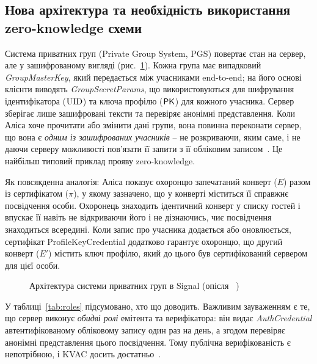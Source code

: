 \subsection{Нова архітектура та необхідність використання zero-knowledge схеми}
Система приватних груп (Private Group System, PGS) повертає стан на сервер, але у зашифрованому вигляді (рис.~\ref{fig:architecture}). 
Кожна група має випадковий \emph{GroupMasterKey}, який передається між учасниками end-to-end; на його основі 
клієнти виводять \emph{GroupSecretParams}, що використовуються для шифрування ідентифікатора ($\mathrm{UID}$) та ключа 
профілю ($\mathsf{PK}$) для кожного учасника. Сервер зберігає лише зашифровані тексти та перевіряє анонімні представлення. 
Коли Аліса хоче прочитати або змінити дані групи, вона повинна переконати сервер, що вона є \emph{одним із зашифрованих учасників} 
-- не розкриваючи, яким саме, і не даючи серверу можливості пов'язати її запити з її обліковим записом~\cite{CPZ20}. 
Це найбільш типовий приклад прояву zero-knowledge.

Як повсякденна аналогія: Аліса показує охоронцю запечатаний конверт ($E$) разом із сертифікатом ($\pi$), у якому 
зазначено, що у конверті міститься її справжнє посвідчення особи. Охоронець знаходить ідентичний конверт у списку 
гостей і впускає її навіть не відкриваючи його і не дізнаючись, чиє посвідчення знаходиться всередині. Коли запис 
про учасника додається або оновлюється, сертифікат ProfileKeyCredential додатково гарантує охоронцю, що 
другий конверт ($E'$) містить ключ профілю, який до цього був сертифікований сервером для цієї особи.

\begin{figure}[!ht]
  \centering
  \begin{minipage}{0.95\linewidth}
    \centering
    
    \caption{Архітектура системи приватних груп в Signal (опісля ~\cite{CPZ20})}
    \label{fig:architecture}
  \end{minipage}
\end{figure}

У таблиці~\ref{tab:roles} підсумовано, хто що доводить. Важливим зауваженням є те, що сервер виконує \emph{обидві ролі} 
емітента та верифікатора: він видає \emph{AuthCredential} автентифікованому обліковому запису один раз на день, 
а згодом перевіряє анонімні представлення цього посвідчення. Тому публічна верифікованість є непотрібною, і KVAC 
досить достатньо~\cite{SignalBlog2019}.

